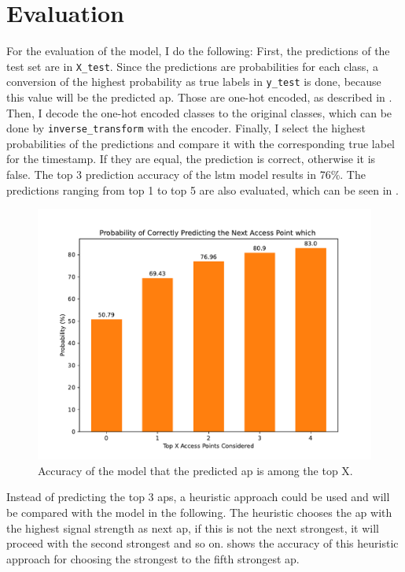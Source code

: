 \chapter{Evaluation}\label{ch:evaluation}

For the evaluation of the model, I do the following:
First, the predictions of the test set are in \texttt{X\_test}.
Since the predictions are probabilities for each class, a conversion of the highest probability as true labels in \texttt{y\_test} is done, because this value will be the predicted \ac{ap}.
Those are one-hot encoded, as described in .
Then, I decode the one-hot encoded classes to the original classes, which can be done by \texttt{inverse\_transform} with the encoder.
Finally, I select the highest probabilities of the predictions and compare it with the corresponding true label for the timestamp.
If they are equal, the prediction is correct, otherwise it is false.
The top 3 prediction accuracy of the \ac{lstm} model results in 76\%.
The predictions ranging from top 1 to top 5 are also evaluated, which can be seen in .

\begin{figure}[h]
    \centering
    \includegraphics*[scale=0.6]{images/ml_plot.pdf}
    \caption{Accuracy of the model that the predicted \ac{ap} is among the top X.}
    \label{fig:ml_plot}
\end{figure}

Instead of predicting the top 3 \acp{ap}, a heuristic approach could be used and will be compared with the model in the following.
The heuristic chooses the \ac{ap} with the highest signal strength as next \ac{ap}, if this is not the next strongest, it will proceed with the second strongest and so on.
 shows the accuracy of this heuristic approach for choosing the strongest to the fifth strongest \ac{ap}.


